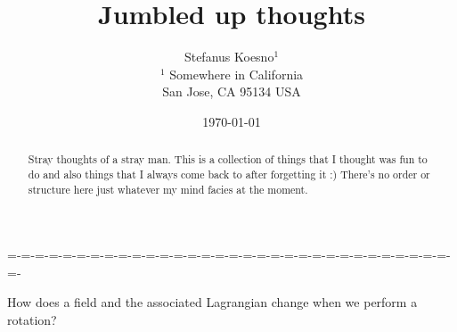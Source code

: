 \documentclass[aps,preprint,preprintnumbers,nofootinbib,showpacs,prd]{revtex4-1}
\begin{document}
\title{Jumbled up thoughts}
\bigskip
\author{Stefanus Koesno$^1$\\
$^1$ Somewhere in California\\ San Jose, CA 95134 USA\\
}
%
\date{\today}
%
\begin{abstract}
Stray thoughts of a stray man. This is a collection of things that I thought was fun to do and also things that I always come back to after forgetting it :) There's no order or structure here just whatever my mind facies at the moment.

\end{abstract}
%
\maketitle

\renewcommand{\theequation}{A.\arabic{equation}}  %
\setcounter{equation}{0}  %
=-=-=-=-=-=-=-=-=-=-=-=-=-=-=-=-=-=-=-=-=-=-=-=-=-=-=-=-=-=-=-=-=-



How does a field and the associated Lagrangian change when we perform a rotation?
\end{document}
